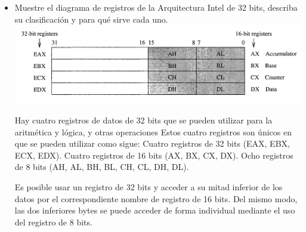 \begin{itemize}
		\item Muestre el diagrama de registros de la Arquitectura Intel de 32 bits, describa su clasificación y para qué sirve cada uno.
		\includegraphics{imagenes/captura3.png}
		
		Hay cuatro registros de datos de 32 bits que se pueden utilizar para la aritmética y lógica, y otras operaciones
Estos cuatro registros son únicos en que se pueden utilizar como sigue:
		Cuatro registros de 32 bits (EAX, EBX, ECX, EDX).
		Cuatro registros de 16 bits (AX, BX, CX, DX).
		Ocho registros de 8 bits (AH, AL, BH, BL, CH, CL, DH, DL).
		
		Es posible usar un registro de 32 bits y acceder a su mitad inferior de los datos por el correspondiente nombre de registro de 16 bits.
		 Del mismo modo, las dos inferiores bytes se puede acceder de forma individual mediante el uso del registro de 8 bits.

	\end{itemize}